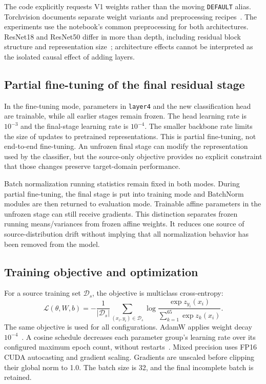 \documentclass[10pt,a4paper]{article}
\begin{document}
The code explicitly requests V1 weights rather than the moving \texttt{DEFAULT} alias. Torchvision documents separate weight variants and preprocessing recipes~\cite{torchvision}. The experiments use the notebook's common preprocessing for both architectures. ResNet18 and ResNet50 differ in more than depth, including residual block structure and representation size~\cite{resnet}; architecture effects cannot be interpreted as the isolated causal effect of adding layers.

\subsection{Partial fine-tuning of the final residual stage}
In the fine-tuning mode, parameters in \texttt{layer4} and the new classification head are trainable, while all earlier stages remain frozen. The head learning rate is $10^{-3}$ and the final-stage learning rate is $10^{-4}$. The smaller backbone rate limits the size of updates to pretrained representations. This is partial fine-tuning, not end-to-end fine-tuning. An unfrozen final stage can modify the representation used by the classifier, but the source-only objective provides no explicit constraint that those changes preserve target-domain performance.

Batch normalization running statistics remain fixed in both modes. During partial fine-tuning, the final stage is put into training mode and BatchNorm modules are then returned to evaluation mode. Trainable affine parameters in the unfrozen stage can still receive gradients. This distinction separates frozen running means/variances from frozen affine weights. It reduces one source of source-distribution drift without implying that all normalization behavior has been removed from the model.

\subsection{Training objective and optimization}
For a source training set $\mathcal D_s$, the objective is multiclass cross-entropy:
\begin{equation}
\mathcal L(\theta,W,b)=-\frac{1}{|\mathcal D_s|}\sum_{(x_i,y_i)\in\mathcal D_s}
\log\frac{\exp z_{y_i}(x_i)}{\sum_{k=1}^{65}\exp z_k(x_i)}.
\end{equation}
The same objective is used for all configurations. AdamW applies weight decay $10^{-4}$~\cite{adamw}. A cosine schedule decreases each parameter group's learning rate over its configured maximum epoch count, without restarts~\cite{sgdr}. Mixed precision uses FP16 CUDA autocasting and gradient scaling. Gradients are unscaled before clipping their global norm to 1.0. The batch size is 32, and the final incomplete batch is retained.
\end{document}
